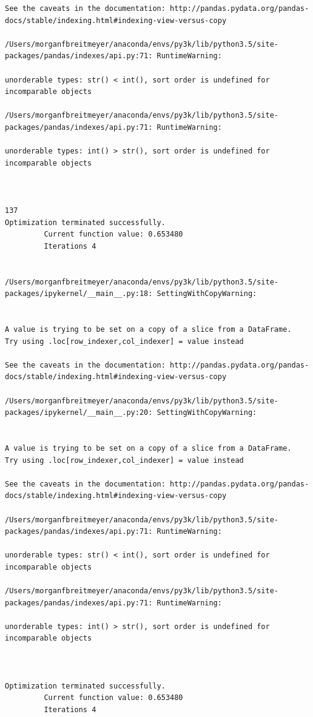 \begin{lstlisting}
See the caveats in the documentation: http://pandas.pydata.org/pandas-docs/stable/indexing.html#indexing-view-versus-copy

/Users/morganfbreitmeyer/anaconda/envs/py3k/lib/python3.5/site-packages/pandas/indexes/api.py:71: RuntimeWarning:

unorderable types: str() < int(), sort order is undefined for incomparable objects

/Users/morganfbreitmeyer/anaconda/envs/py3k/lib/python3.5/site-packages/pandas/indexes/api.py:71: RuntimeWarning:

unorderable types: int() > str(), sort order is undefined for incomparable objects



137
Optimization terminated successfully.
         Current function value: 0.653480
         Iterations 4


/Users/morganfbreitmeyer/anaconda/envs/py3k/lib/python3.5/site-packages/ipykernel/__main__.py:18: SettingWithCopyWarning:


A value is trying to be set on a copy of a slice from a DataFrame.
Try using .loc[row_indexer,col_indexer] = value instead

See the caveats in the documentation: http://pandas.pydata.org/pandas-docs/stable/indexing.html#indexing-view-versus-copy

/Users/morganfbreitmeyer/anaconda/envs/py3k/lib/python3.5/site-packages/ipykernel/__main__.py:20: SettingWithCopyWarning:


A value is trying to be set on a copy of a slice from a DataFrame.
Try using .loc[row_indexer,col_indexer] = value instead

See the caveats in the documentation: http://pandas.pydata.org/pandas-docs/stable/indexing.html#indexing-view-versus-copy

/Users/morganfbreitmeyer/anaconda/envs/py3k/lib/python3.5/site-packages/pandas/indexes/api.py:71: RuntimeWarning:

unorderable types: str() < int(), sort order is undefined for incomparable objects

/Users/morganfbreitmeyer/anaconda/envs/py3k/lib/python3.5/site-packages/pandas/indexes/api.py:71: RuntimeWarning:

unorderable types: int() > str(), sort order is undefined for incomparable objects



Optimization terminated successfully.
         Current function value: 0.653480
         Iterations 4



\end{lstlisting}
